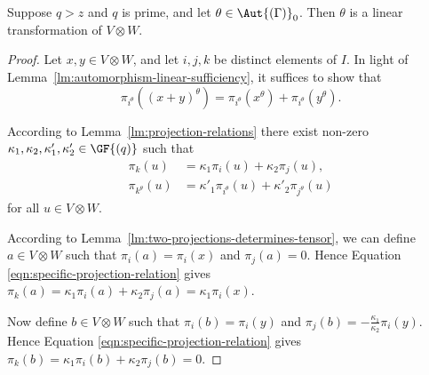 \begin{lemma} \label{lm:automorphism-stabiliser-linear}
Suppose $q > z$ and $q$ is prime, and let $\theta \in \Aut{\left(\Gamma \right)}_0$. Then $\theta$ is a linear transformation of $V \otimes W$.
\end{lemma}
\begin{proof}
Let $x, y \in V \otimes W$, and let $i, j, k$ be distinct elements of $I$. In light of Lemma~\ref{lm:automorphism-linear-sufficiency}, it suffices to show that
\begin{displaymath}
    \pi_{i^\theta}{\left(\left(x + y \right)^\theta \right)} = \pi_{i^\theta}{\left(x^\theta \right)} + \pi_{i^\theta}{\left(y^\theta \right)}.
\end{displaymath}

According to Lemma~\ref{lm:projection-relations} there exist non-zero $\kappa_1, \kappa_2, \kappa'_1, \kappa'_2 \in \GF{\left(q \right)}$ such that
\begin{align}
    \pi_k{\left(u \right)} &= \kappa_1 \pi_i{\left(u \right)} + \kappa_2 \pi_j{\left(u \right)}, \label{eqn:specific-projection-relation} \\
    \pi_{k^\theta}{\left(u \right)} &= \kappa'_1 \pi_{i^\theta}{\left(u \right)} + \kappa'_2 \pi_{j^\theta}{\left(u \right)} \label{eqn:specific-projection-relation-image}
\end{align}
for all $u \in V \otimes W$.

According to Lemma~\ref{lm:two-projections-determines-tensor}, we can define $a \in V \otimes W$ such that $\pi_i{\left(a \right)} = \pi_i{\left(x \right)}$ and $\pi_j{\left(a \right)} = 0$. Hence Equation \eqref{eqn:specific-projection-relation} gives $\pi_k{\left(a \right)} = \kappa_1 \pi_i{\left(a \right)} + \kappa_2 \pi_j{\left(a \right)} = \kappa_1 \pi_i{\left(x \right)}$.

Now define $b \in V \otimes W$ such that $\pi_i{\left(b \right)} = \pi_i{\left(y \right)}$ and $\pi_j{\left(b \right)} = -\frac{\kappa_1}{\kappa_2} \pi_i{\left(y \right)}$. Hence Equation \eqref{eqn:specific-projection-relation} gives $\pi_k{\left(b \right)} = \kappa_1 \pi_i{\left(b \right)} + \kappa_2 \pi_j{\left(b \right)} = 0$.


\end{proof}
